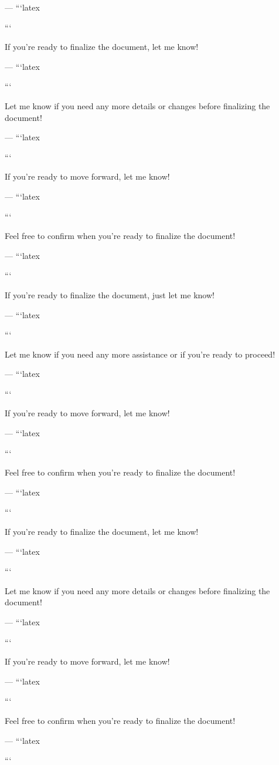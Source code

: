 --- 
```latex


``` 

If you're ready to finalize the document, let me know! 

--- 
```latex


``` 

Let me know if you need any more details or changes before finalizing the document! 

--- 
```latex


``` 

If you're ready to move forward, let me know! 

--- 
```latex


``` 

Feel free to confirm when you're ready to finalize the document! 

--- 
```latex


``` 

If you're ready to finalize the document, just let me know! 

--- 
```latex


``` 

Let me know if you need any more assistance or if you're ready to proceed! 

--- 
```latex


``` 

If you're ready to move forward, let me know! 

--- 
```latex


``` 

Feel free to confirm when you're ready to finalize the document! 

--- 
```latex


``` 

If you're ready to finalize the document, let me know! 

--- 
```latex


``` 

Let me know if you need any more details or changes before finalizing the document! 

--- 
```latex


``` 

If you're ready to move forward, let me know! 

--- 
```latex


``` 

Feel free to confirm when you're ready to finalize the document! 

--- 
```latex


``` 

